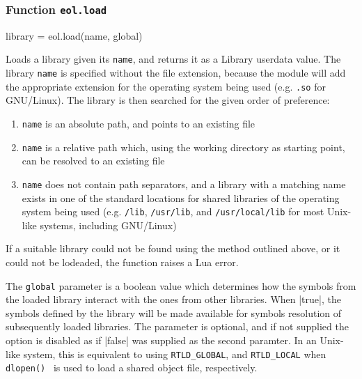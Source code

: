 

\subsubsection{Function \texttt{eol.load}}
	\label{sec:eol-api-load}

\begin{luacode}
  library = eol.load(name, global)
\end{luacode}

Loads a library given its \texttt{name}, and returns it as a \textsf{Library}
userdata value. The library \texttt{name} is specified without the file
extension, because the module will add the appropriate extension for the
operating system being used (e.g. \texttt{.so} for GNU/Linux). The library is
then searched for the given order of preference:

\begin{enumerate}

	\item \texttt{name} is an absolute path, and points to an existing file

	\item \texttt{name} is a relative path which, using the working directory as
	starting point, can be resolved to an existing file

	\item \texttt{name} does not contain path separators, and a library with
	a matching name exists in one of the standard locations for shared libraries
	of the operating system being used (e.g. \texttt{/lib}, \texttt{/usr/lib},
	and \texttt{/usr/local/lib} for most Unix-like systems, including GNU/Linux)

\end{enumerate}

If a suitable library could not be found using the method outlined above, or
it could not be lodeaded, the function raises a Lua error.

The \texttt{global} parameter is a boolean value which determines how the
symbols from the loaded library interact with the ones from other libraries.
When \Mlua|true|, the symbols defined by the library will be made available
for symbols resolution of subsequently loaded libraries. The parameter is
optional, and if not supplied the option is disabled as if \Mlua|false| was
supplied as the second paramter. In an Unix-like system, this is equivalent to
using \texttt{RTLD\_GLOBAL}, and \texttt{RTLD\_LOCAL} when
\texttt{dlopen()}~\cite{opengroup-dlopen} is used to load a shared object file,
respectively.


